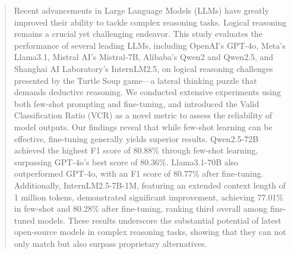 \documentclass[conference]{IEEEtran}
\begin{document}
\begin{abstract}

Recent advancements in Large Language Models (LLMs) have greatly improved their ability to tackle complex reasoning tasks. Logical reasoning remains a crucial yet challenging endeavor. This study evaluates the performance of several leading LLMs, including OpenAI’s GPT-4o, Meta’s Llama3.1, Mistral AI's Mistral-7B, Alibaba’s Qwen2 and Qwen2.5, and Shanghai AI Laboratory’s InternLM2.5, on logical reasoning challenges presented by the Turtle Soup game—a lateral thinking puzzle that demands deductive reasoning. We conducted extensive experiments using both few-shot prompting and fine-tuning, and introduced the Valid Classification Ratio (VCR) as a novel metric to assess the reliability of model outputs. Our findings reveal that while few-shot learning can be effective, fine-tuning generally yields superior results. Qwen2.5-72B achieved the highest F1 score of 80.88\% through few-shot learning, surpassing GPT-4o's best score of 80.36\%. Llama3.1-70B also outperformed GPT-4o, with an F1 score of 80.77\% after fine-tuning. Additionally, InternLM2.5-7B-1M, featuring an extended context length of 1 million tokens, demonstrated significant improvement, achieving 77.01\% in few-shot and 80.28\% after fine-tuning, ranking third overall among fine-tuned models. These results underscore the substantial potential of latest open-source models in complex reasoning tasks, showing that they can not only match but also surpass proprietary alternatives.




\end{abstract}
\end{document}
